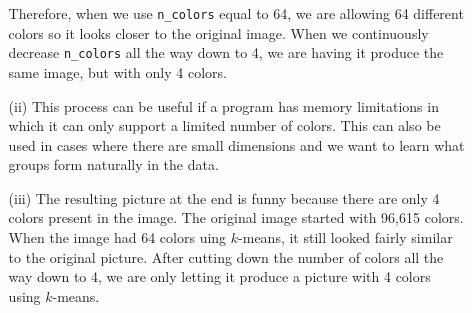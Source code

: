 \documentclass[a4paper]{article}
\begin{document}
\begin{itemize}
\begin{itemize}
        Therefore, when we use \verb|n_colors| equal to 64, we are allowing 64 different colors so 
        it looks closer to the original image.  When we continuously decrease \verb|n_colors| all 
        the way down to 4, we are having it produce the same image, but with only 4 colors.
        \item[(ii)] This process can be useful if a program has memory limitations in which it 
        can only support a limited number of colors.  This can also be used in cases where there 
        are small dimensions and we want to learn what groups form naturally in the data.
        \item[(iii)] The resulting picture at the end is funny because there are only 4 colors 
        present in the image.  The original image started with 96,615 colors.  When the image 
        had 64 colors uing $k$-means, it still looked fairly similar to the original picture.  
        After cutting down the number of colors all the way down to 4, we are only letting it 
        produce a picture with 4 colors using $k$-means.
    \end{itemize}
\end{itemize}

\end{document}
